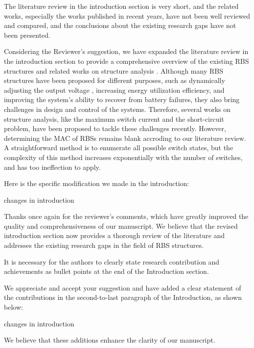 \begin{revcomment}
  The literature review in the introduction section is very short, and the related works, especially the works published in recent years, have not been well reviewed and compared, and the conclusions about the existing research gaps have not been presented.
\end{revcomment}
\begin{revresponse}

Considering the Reviewer’s suggestion, we have expanded the literature review in the introduction section to provide a comprehensive overview of the existing RBS structures \cite{ci2007novel,9209774,engelhardt2021double,visairoReconfigurableBatteryPack2008,lawsonSoftwareConfigurableBattery2012,he2014reconfiguration,kim2009dynamic} and related works on structure analysis \cite{han2021analysis,chenSneakCircuitTheory2021}. 
Although many RBS structures have been proposed for different purposes, such as dynamically adjusting the output voltage , increasing energy utilization efficiency, and improving the system's ability to recover from battery failures, they also bring challenges in design and control of the systems.
Therefore, several works on structure analysis, like the maximum switch current and the short-circuit problem, have been proposed to tackle these challenges recently.
However, determining the MAC of RBSs remains blank accroding to our literature review.
A straightforward method is to enumerate all possible switch states, but the complexity of this method increases exponentially with the number of switches, and has too ineffection to apply.


Here is the specific modification we made in the introduction:
\begin{changes}
  changes in introduction
\end{changes}

  
Thanks once again for the reviewer's comments, which have greatly improved the quality and comprehensiveness of our manuscript. We believe that the revised introduction section now provides a thorough review of the literature and addresses the existing research gaps in the field of RBS structures.
  
\end{revresponse}

\begin{revcomment}
  It is necessary for the authors to clearly state research contribution and achievements as bullet points at the end of the Introduction section.
\end{revcomment}
\begin{revresponse}

We appreciate and accept your suggestion and have added a clear statement of the contributions in the second-to-last paragraph of the Introduction, as shown below:
\begin{changes}
  changes in introduction
\end{changes}


We believe that these additions enhance the clarity of our manuscript. 

\end{revresponse}

